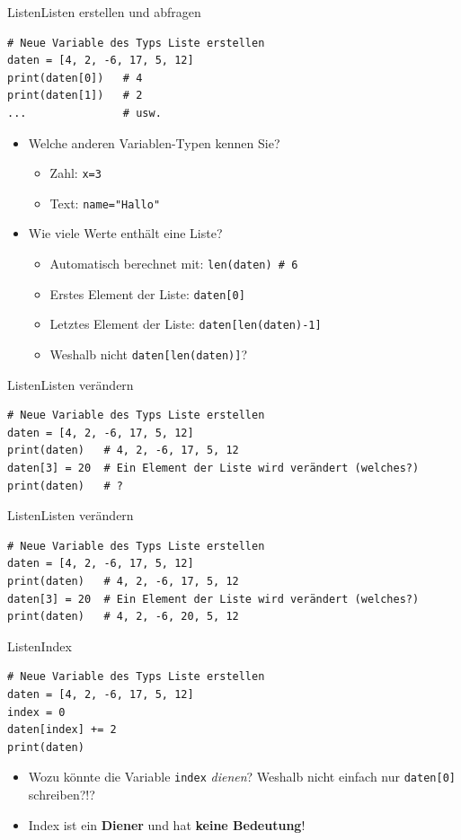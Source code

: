 \begin{frame}[fragile]{Listen}{Listen erstellen und abfragen}
\begin{lstlisting}
# Neue Variable des Typs Liste erstellen
daten = [4, 2, -6, 17, 5, 12] 
print(daten[0])   # 4
print(daten[1])   # 2
...               # usw.
\end{lstlisting}

\begin{itemize}[<+->]
\item Welche anderen Variablen-Typen kennen Sie?
\begin{itemize}
\item Zahl: \lstinline|x=3|
\item Text: \lstinline|name="Hallo"|
\end{itemize}
\item Wie viele Werte enthält eine Liste?
\begin{itemize}
\item Automatisch berechnet mit: \lstinline|len(daten) # 6|
\item Erstes Element der Liste: \lstinline|daten[0]|
\item Letztes Element der Liste: \lstinline|daten[len(daten)-1]|
\item Weshalb nicht \lstinline|daten[len(daten)]|?
\end{itemize}
\end{itemize}
\end{frame}

\begin{frame}[fragile]{Listen}{Listen verändern}
\begin{lstlisting}
# Neue Variable des Typs Liste erstellen
daten = [4, 2, -6, 17, 5, 12] 
print(daten)   # 4, 2, -6, 17, 5, 12
daten[3] = 20  # Ein Element der Liste wird verändert (welches?)
print(daten)   # ?
\end{lstlisting}
\end{frame}

\begin{frame}[fragile]{Listen}{Listen verändern}
\begin{lstlisting}
# Neue Variable des Typs Liste erstellen
daten = [4, 2, -6, 17, 5, 12] 
print(daten)   # 4, 2, -6, 17, 5, 12
daten[3] = 20  # Ein Element der Liste wird verändert (welches?)
print(daten)   # 4, 2, -6, 20, 5, 12
\end{lstlisting}
\end{frame}


\begin{frame}[fragile]{Listen}{Index}
\begin{lstlisting}
# Neue Variable des Typs Liste erstellen
daten = [4, 2, -6, 17, 5, 12] 
index = 0
daten[index] += 2
print(daten)
\end{lstlisting}


\begin{itemize}[<+->]
\item Wozu könnte die Variable \lstinline|index| \textit{dienen}? Weshalb nicht einfach nur \lstinline|daten[0]| schreiben?!?
\item Index ist ein \textbf{Diener} und hat \textbf{keine Bedeutung}! 
\end{itemize}
\end{frame}

